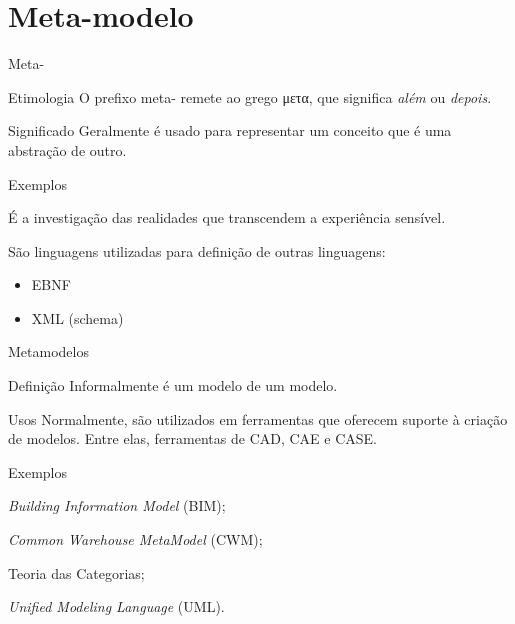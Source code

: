 \documentclass[12pt,t]{beamer}
\begin{document}
 \section{Meta-modelo}
	 \begin{frame}{Meta-}
	 	\begin{block}{Etimologia}
	 		O prefixo meta- remete ao grego μετα, que significa \emph{além} ou \emph{depois}.
	 	\end{block}
	 	\pause
	 	\begin{block}{Significado}
	 		Geralmente é usado para representar um conceito que é uma abstração de outro.
	 	\end{block}
	 	\pause
	 	\begin{exampleblock}{Exemplos}
	 		\begin{description}[Metalinguagem]
	 			\item [Metafísica] É a investigação das realidades que transcendem a experiência sensível.
	 			\item [Metalinguagem] São linguagens utilizadas para definição de outras linguagens:
	 			\begin{itemize}
	 				\item EBNF 
	 				\item XML (schema)
	 			\end{itemize}
	 		\end{description}
	 	\end{exampleblock}
	 	\end{frame}
	 	\begin{frame}{Metamodelos}
	 		\begin{block}{Definição}
	 			Informalmente é um modelo de um modelo.
	 		\end{block}
	 		\pause
	 		\begin{block}{Usos}
	 			Normalmente, são utilizados em ferramentas que oferecem suporte à criação de modelos. Entre elas, ferramentas de CAD, CAE e CASE.
	 		\end{block}
	 		\pause
	 		\begin{exampleblock}{Exemplos}
	 			\begin{description}[Datawarehousing]
	 			\item [Construção Civil] \emph{Building Information Model} (BIM);
	 			\item [Datawarehousing]		
	 		\emph{Common Warehouse MetaModel} (CWM);
	 			\item [Matemática] Teoria das Categorias;
	 			\item [Programas OO] \emph{Unified Modeling Language} (UML).
	 		\end{description}
		\end{exampleblock}
	 \end{frame}
\end{document}

